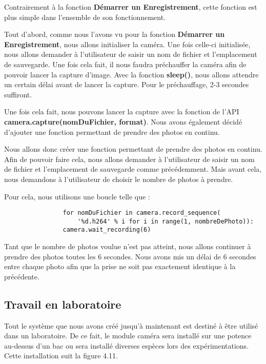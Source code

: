         
        Contrairement à la fonction \textbf{Démarrer un Enregistrement}, cette fonction est plus simple dans l'ensemble de son fonctionnement. 
        
        \vspace{0.2cm}

        Tout d'abord, comme nous l'avons vu pour la fonction \textbf{Démarrer un Enregistrement}, nous allons initialiser la caméra. Une fois celle-ci initialisée, nous allons demander à l'utilisateur de saisir un nom de fichier et l'emplacement de sauvegarde. Une fois cela fait, il nous faudra préchauffer la caméra afin de pouvoir lancer la capture d'image. Avec la fonction \textbf{sleep()}, nous allons attendre un certain délai avant de lancer la capture.
        Pour le préchauffage, 2-3 secondes suffiront.

        \vspace{0.2cm}

        Une fois cela fait, nous pouvons lancer la capture avec la fonction de l'API \textbf{camera.capture(nomDuFichier, format)}. Nous avons également décidé d'ajouter une fonction permettant de prendre des photos en continu.

        \vspace{0.2cm}

        Nous allons donc créer une fonction permettant de prendre des photos en continu.
        Afin de pouvoir faire cela, nous allons demander à l'utilisateur de saisir un nom de fichier et l'emplacement de sauvegarde comme précédemment.
        Mais avant cela, nous demandons à l'utilisateur de choisir le nombre de photos à prendre.

        \begin{flushleft}
            Pour cela, nous utilisons une boucle telle que : 
            \begin{verbatim}
                for nomDuFichier in camera.record_sequence(
                    '%d.h264' % i for i in range(1, nombreDePhoto)):
                camera.wait_recording(6)
            \end{verbatim}            
        \end{flushleft}

        Tant que le nombre de photos voulue n'est pas atteint, nous allons continuer à prendre des photos toutes les 6 secondes. Nous avons mis un délai de 6 secondes entre chaque photo afin que la prise ne soit pas exactement identique à la précédente.
    
        \subsection{Travail en laboratoire}
        Tout le système que nous avons créé jusqu'à maintenant est destiné à être utilisé dans un laboratoire. De ce fait, le module caméra sera installé sur une potence au-dessus d'un bac ou sera installé diverses espèces lors des expérimentations. Cette installation suit la figure 4.11.

